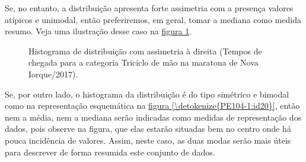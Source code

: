 Se, no entanto, a distribuição apresenta forte assimetria com a presença valores atípicos e unimodal, então preferiremos, em geral, tomar a mediana como medida resumo. Veja uma ilustração desse caso na \hyperref[\detokenize{PE104-1:id19}]{figura \ref{\detokenize{PE104-1:id19}}}.

\begin{figure}[H]
\centering
\capstart

\caption{Histograma de distribuição com assimetria à direita (Tempos de chegada para a categoria Triciclo de mão na maratona de Nova Iorque/2017).}\label{\detokenize{PE104-1:fig-assimetriadireita}}\label{\detokenize{PE104-1:id19}}\end{figure}

Se, por outro lado, o histograma da distribuição é do tipo simétrico e bimodal como na representação esquemática na \hyperref[\detokenize{PE104-1:id20}]{figura \ref{\detokenize{PE104-1:id20}}}, então nem a média, nem a mediana serão indicadas como medidas de representação dos dados, pois observe na figura, que elas estarão situadas bem no centro onde há pouca incidência de valores. Assim, neste caso, as duas modas serão mais úteis para descrever de forma resumida este conjunto de dados.

